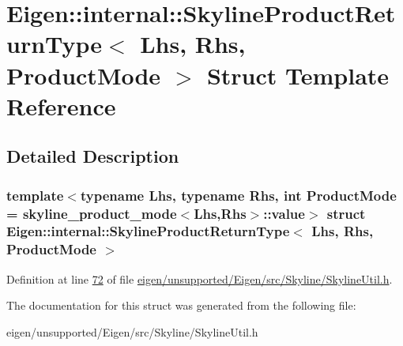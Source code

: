 \hypertarget{struct_eigen_1_1internal_1_1_skyline_product_return_type}{}\section{Eigen\+:\+:internal\+:\+:Skyline\+Product\+Return\+Type$<$ Lhs, Rhs, Product\+Mode $>$ Struct Template Reference}
\label{struct_eigen_1_1internal_1_1_skyline_product_return_type}


\subsection{Detailed Description}
\subsubsection*{template$<$typename Lhs, typename Rhs, int Product\+Mode = skyline\+\_\+product\+\_\+mode$<$\+Lhs,\+Rhs$>$\+::value$>$\newline
struct Eigen\+::internal\+::\+Skyline\+Product\+Return\+Type$<$ Lhs, Rhs, Product\+Mode $>$}



Definition at line \hyperlink{eigen_2unsupported_2_eigen_2src_2_skyline_2_skyline_util_8h_source_l00072}{72} of file \hyperlink{eigen_2unsupported_2_eigen_2src_2_skyline_2_skyline_util_8h_source}{eigen/unsupported/\+Eigen/src/\+Skyline/\+Skyline\+Util.\+h}.



The documentation for this struct was generated from the following file\+:\begin{DoxyCompactItemize}
\item 
eigen/unsupported/\+Eigen/src/\+Skyline/\+Skyline\+Util.\+h\end{DoxyCompactItemize}
